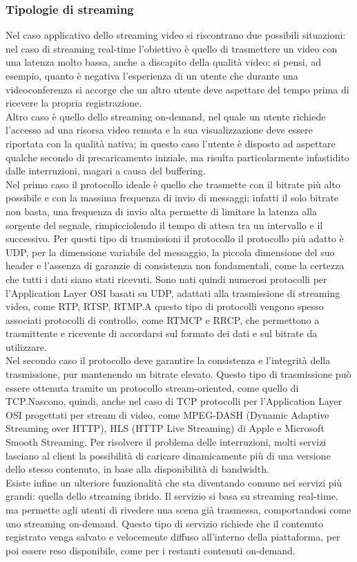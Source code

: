 		\subsubsection{Tipologie di streaming}
			Nel caso applicativo dello streaming video si riscontrano due possibili situazioni:
			nel caso di streaming real-time l'obiettivo è quello di trasmettere un video con una latenza molto bassa, anche a discapito della qualità video; si pensi, ad esempio, quanto è negativa l'esperienza di un utente che durante una videoconferenza si accorge che un altro utente deve aspettare del tempo prima di ricevere la propria registrazione.
			\\
			Altro caso è quello dello streaming on-demand, nel quale un utente richiede l'accesso ad una risorsa video remota e la sua visualizzazione deve essere riportata con la qualità nativa; in questo caso l'utente è disposto ad aspettare qualche secondo di precaricamento iniziale, ma risulta particolarmente infastidito dalle interruzioni, magari a causa del buffering.
			\\
			Nel primo caso il protocollo ideale è quello che trasmette con il bitrate più alto possibile e con la massima frequenza di invio di messaggi; infatti il solo bitrate non basta, una frequenza di invio alta permette di limitare la latenza alla sorgente del segnale, rimpicciolendo il tempo di attesa tra un intervallo e il successivo. Per questi tipo di trasmissioni il protocollo il protocollo più adatto è UDP, per la dimensione variabile del messaggio, la piccola dimensione del suo header e l'assenza di garanzie di consistenza non fondamentali, come la certezza che tutti i dati siano stati ricevuti. Sono nati quindi numerosi protocolli per l'Application Layer OSI basati su UDP, adattati alla trasmissione di streaming video, come RTP, RTSP, RTMP.\@ A questo tipo di protocolli vengono spesso associati protocolli di controllo, come RTMCP e RRCP, che permettono a trasmittente e ricevente di accordarsi sul formato dei dati e sul bitrate da utilizzare.
			\\
			Nel secondo caso il protocollo deve garantire la consistenza e l'integrità della trasmissione, pur mantenendo un bitrate elevato. Questo tipo di trasmissione può essere ottenuta tramite un protocollo stream-oriented, come quello di TCP.\@ Nascono, quindi, anche nel caso di TCP protocolli per l'Application Layer OSI progettati per stream di video, come MPEG-DASH (Dynamic Adaptive Streaming over HTTP), HLS (HTTP Live Streaming) di Apple e Microsoft Smooth Streaming. Per risolvere il problema delle interruzioni, molti servizi lasciano al client la possibilità di caricare dinamicamente più di una versione dello stesso contenuto, in base alla disponibilità di bandwidth.
			\\
			Esiste infine un ulteriore funzionalità che sta diventando comune nei servizi più grandi: quella dello streaming ibrido. Il servizio si basa su streaming real-time, ma permette agli utenti di rivedere una scena già trasmessa, comportandosi come uno streaming on-demand. Questo tipo di servizio richiede che il contenuto registrato venga salvato e velocemente diffuso all'interno della piattaforma, per poi essere reso disponibile, come per i restanti contenuti on-demand.


